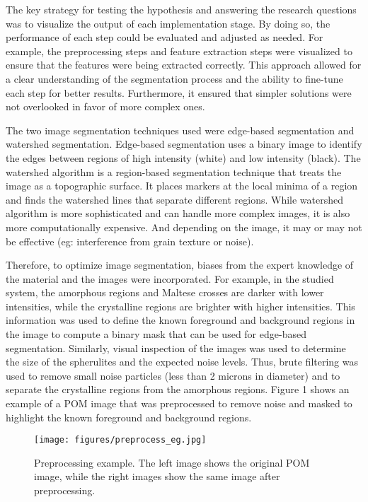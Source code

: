 \documentclass[12pt]{article}
\begin{document}
The key strategy for testing the hypothesis and answering the research questions was to visualize the output of each implementation stage.
By doing so, the performance of each step could be evaluated and adjusted as needed. 
For example, the preprocessing steps and feature extraction steps were visualized to ensure that the features were being extracted correctly.
This approach allowed for a clear understanding of the segmentation process and the ability to fine-tune each step for better results.
Furthermore, it ensured that simpler solutions were not overlooked in favor of more complex ones.

The two image segmentation techniques used were edge-based segmentation and watershed segmentation.
Edge-based segmentation uses a binary image to identify the edges between regions of high intensity (white) and low intensity (black).
The watershed algorithm is a region-based segmentation technique that treats the image as a topographic surface. 
It places markers at the local minima of a region and finds the watershed lines that separate different regions. 
While watershed algorithm is more sophisticated and can handle more complex images, it is also more computationally expensive. And depending
on the image, it may or may not be effective (eg: interference from grain texture or noise).

Therefore, to optimize image segmentation, biases from the expert knowledge of the material and the images were incorporated.
For example, in the studied system, the amorphous regions and Maltese crosses are darker with lower intensities, while the crystalline regions are brighter with higher intensities.
This information was used to define the known foreground and background regions in the image to compute a binary mask that can be used for edge-based segmentation.
Similarly, visual inspection of the images was used to determine the size of the spherulites and the expected noise levels. Thus, brute filtering was used to remove
small noise particles (less than 2 microns in diameter) and to separate the crystalline regions from the amorphous regions. Figure 1 shows an example of a POM image 
that was preprocessed to remove noise and masked to highlight the known foreground and background regions. 

\begin{figure}[ht]
    \centering
    \texttt{[image: figures/preprocess\_eg.jpg]}
    \caption{\centering Preprocessing example. The left image shows the original POM image, while the right images show the same image after preprocessing.}
\end{figure}
\end{document}
